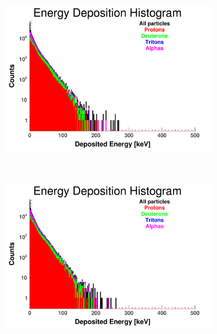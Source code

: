 \documentclass[10pt,a4paper]{report}
\begin{document}
\begin{figure}[htbp]
    \centering
    \begin{subfigure}[htbp]{0.42\textwidth}
        \label{fig:E1}
        \includegraphics[width=\textwidth]{./E1_FTFP_INCLXX_HP_Edep.png}
    \end{subfigure}
    ~ 
    \begin{subfigure}[htbp]{0.42\textwidth}
        \label{fig:E2}
        \includegraphics[width=\textwidth]{./E2_QGSP_INCLXX_Edep.png}
    \end{subfigure}
    
    \vspace{1mm}
    

\end{figure}
\end{document}
